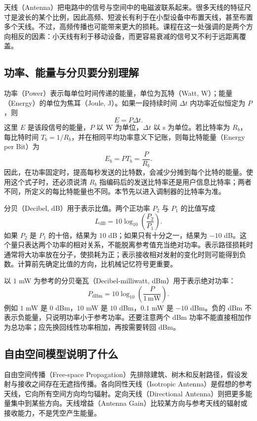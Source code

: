 天线（Antenna）把电路中的信号与空间中的电磁波联系起来。很多天线的特征尺寸是波长的某个比例，因此高频、短波长有利于在小型设备中布置天线，甚至布置多个天线。不过，高频传播也可能带来更大的损耗。课程在这一处强调的是两个方向相反的因素：小天线有利于移动设备，而更容易衰减的信号又不利于远距离覆盖。

\subsection{功率、能量与分贝要分别理解}
功率（Power）表示每单位时间传递的能量，单位为瓦特（Watt, W）；能量（Energy）的单位为焦耳（Joule, J）。如果一段持续时间 $\Delta t$ 内功率近似恒定为 $P$，则
\begin{equation}
E=P\Delta t.
\end{equation}
这里 $E$ 是该段信号的能量，$P$ 以 W 为单位，$\Delta t$ 以 s 为单位。若比特率为 $R_b$，每比特时间 $T_b=1/R_b$，并在相同平均功率意义下记账，则每比特能量（Energy per Bit）为
\begin{equation}
E_b=PT_b=\frac{P}{R_b}.
\end{equation}
因此，在功率固定时，提高每秒发送的比特数，会减少分摊到每个比特的能量。使用这个式子时，还必须说清 $R_b$ 指编码后的发送比特率还是用户信息比特率；两者不同，所定义的每比特能量也不同。本节先以进入调制器的比特率为准。

分贝（Decibel, dB）用于表示比值。两个正功率 $P_2$ 与 $P_1$ 的比值写成
\begin{equation}
L_{\mathrm{dB}}=10\log_{10}\!\left(\frac{P_2}{P_1}\right).
\end{equation}
如果 $P_2$ 是 $P_1$ 的十倍，结果为 $10$ dB；如果只有十分之一，结果为 $-10$ dB。这个量只表达两个功率的相对关系，不能脱离参考值充当绝对功率。表示路径损耗时通常将大功率放在分子，使损耗为正；表示接收相对发射的变化时则可能得到负数。计算前先确定比值的方向，比机械记忆符号更重要。

以 $1$ mW 为参考的分贝毫瓦（Decibel-milliwatt, dBm）用于表示绝对功率：
\begin{equation}
P_{\mathrm{dBm}}=10\log_{10}\!\left(\frac{P}{1\,\mathrm{mW}}\right).
\end{equation}
例如 $1$ mW 是 $0$ dBm，$10$ mW 是 $10$ dBm，$0.1$ mW 是 $-10$ dBm。负的 dBm 不表示负能量，只说明功率小于参考功率。还要注意两个 dBm 功率不能直接相加作为总功率；应先换回线性功率相加，再按需要转回 dBm。

\subsection{自由空间模型说明了什么}
自由空间传播（Free-space Propagation）先排除建筑、树木和反射路径，假设发射与接收之间存在无遮挡传播。各向同性天线（Isotropic Antenna）是假想的参考天线，它向所有空间方向均匀辐射。定向天线（Directional Antenna）则把更多能量集中到某些方向。天线增益（Antenna Gain）比较某方向与参考天线的辐射或接收能力，不是凭空产生能量。

